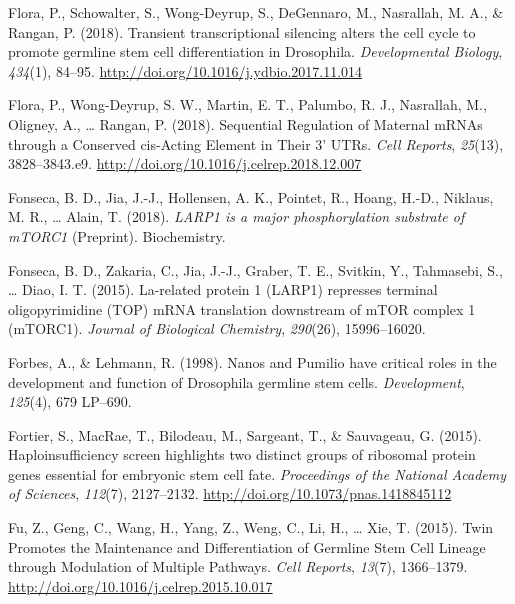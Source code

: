\documentclass[12pt,oneside]{reedthesis}
\newlength{\cslhangindent}
\newenvironment{cslreferences}%
  {\setlength{\parindent}{0pt}%
  \everypar{\setlength{\hangindent}{\cslhangindent}}\ignorespaces}%
  {\par}
\begin{document}
\begin{cslreferences}
\leavevmode\hypertarget{ref-Flora2018l}{}%
Flora, P., Schowalter, S., Wong-Deyrup, S., DeGennaro, M., Nasrallah, M. A., \& Rangan, P. (2018). Transient transcriptional silencing alters the cell cycle to promote germline stem cell differentiation in Drosophila. \emph{Developmental Biology}, \emph{434}(1), 84--95. \url{http://doi.org/10.1016/j.ydbio.2017.11.014}

\leavevmode\hypertarget{ref-Flora2018k}{}%
Flora, P., Wong-Deyrup, S. W., Martin, E. T., Palumbo, R. J., Nasrallah, M., Oligney, A., \ldots{} Rangan, P. (2018). Sequential Regulation of Maternal mRNAs through a Conserved cis-Acting Element in Their 3' UTRs. \emph{Cell Reports}, \emph{25}(13), 3828--3843.e9. \url{http://doi.org/10.1016/j.celrep.2018.12.007}

\leavevmode\hypertarget{ref-fonsecaLARP1MajorPhosphorylation2018}{}%
Fonseca, B. D., Jia, J.-J., Hollensen, A. K., Pointet, R., Hoang, H.-D., Niklaus, M. R., \ldots{} Alain, T. (2018). \emph{LARP1 is a major phosphorylation substrate of mTORC1} (Preprint). Biochemistry.

\leavevmode\hypertarget{ref-Fonseca2015a}{}%
Fonseca, B. D., Zakaria, C., Jia, J.-J., Graber, T. E., Svitkin, Y., Tahmasebi, S., \ldots{} Diao, I. T. (2015). La-related protein 1 (LARP1) represses terminal oligopyrimidine (TOP) mRNA translation downstream of mTOR complex 1 (mTORC1). \emph{Journal of Biological Chemistry}, \emph{290}(26), 15996--16020.

\leavevmode\hypertarget{ref-Forbes1998g}{}%
Forbes, A., \& Lehmann, R. (1998). Nanos and Pumilio have critical roles in the development and function of Drosophila germline stem cells. \emph{Development}, \emph{125}(4), 679 LP--690.

\leavevmode\hypertarget{ref-fortierHaploinsufficiencyScreenHighlights2015}{}%
Fortier, S., MacRae, T., Bilodeau, M., Sargeant, T., \& Sauvageau, G. (2015). Haploinsufficiency screen highlights two distinct groups of ribosomal protein genes essential for embryonic stem cell fate. \emph{Proceedings of the National Academy of Sciences}, \emph{112}(7), 2127--2132. \url{http://doi.org/10.1073/pnas.1418845112}

\leavevmode\hypertarget{ref-Fu2015h}{}%
Fu, Z., Geng, C., Wang, H., Yang, Z., Weng, C., Li, H., \ldots{} Xie, T. (2015). Twin Promotes the Maintenance and Differentiation of Germline Stem Cell Lineage through Modulation of Multiple Pathways. \emph{Cell Reports}, \emph{13}(7), 1366--1379. \url{http://doi.org/10.1016/j.celrep.2015.10.017}


\end{cslreferences}
\end{document}
